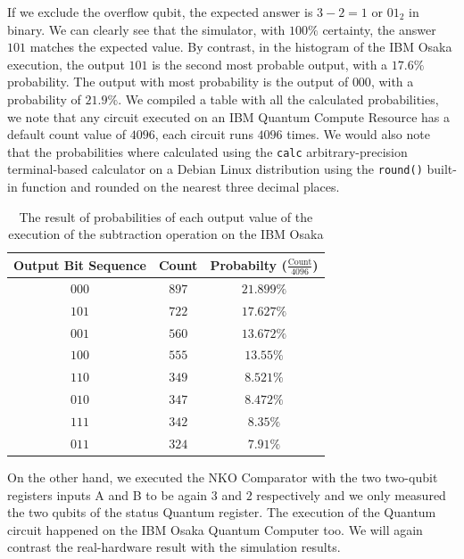 If we exclude the overflow qubit, the expected answer is $3-2=1$ or $01_2$ in binary. We can clearly see that the simulator, with $100\%$ certainty, the answer $101$ matches
the expected value. By contrast, in the histogram of the IBM Osaka execution, the output $101$ is the second most probable output, with a $17.6\%$ probability. The output
with most probability is the output of $000$, with a probability of $21.9\%$. We compiled a table with all the calculated probabilities, we note that any circuit executed on
an IBM Quantum Compute Resource has a default count value of $4096$, each circuit runs $4096$ times. We would also note that the probabilities where calculated using the
\verb|calc| arbitrary-precision terminal-based calculator on a Debian Linux distribution using the \verb|round()| built-in function and rounded on the nearest three decimal places.

\begin{table}[ht]
    \centering
    \begin{tabular}{c|c|c}
        Output Bit Sequence & Count & Probabilty ($\frac{\text{Count}}{4096}$) \\
        \hline
        $000$ & $897$ & $21.899\%$ \\
        $101$ & $722$ & $17.627\%$ \\
        $001$ & $560$ & $13.672\%$ \\
        $100$ & $555$ & $13.55\%$ \\
        $110$ & $349$ & $8.521\%$ \\
        $010$ & $347$ & $8.472\%$ \\
        $111$ & $342$ & $8.35\%$ \\
        $011$ & $324$ & $7.91\%$ \\
    \end{tabular}
    \caption{The result of probabilities of each output value of the execution of the subtraction operation on the IBM Osaka}
\end{table}

\newpage

On the other hand, we executed the NKO Comparator with the two two-qubit registers inputs A and B to be again $3$ and $2$ respectively and we only measured the two qubits
of the status Quantum register. The execution of the Quantum circuit happened on the IBM Osaka Quantum Computer too. We will again contrast the real-hardware result with the
simulation results.

